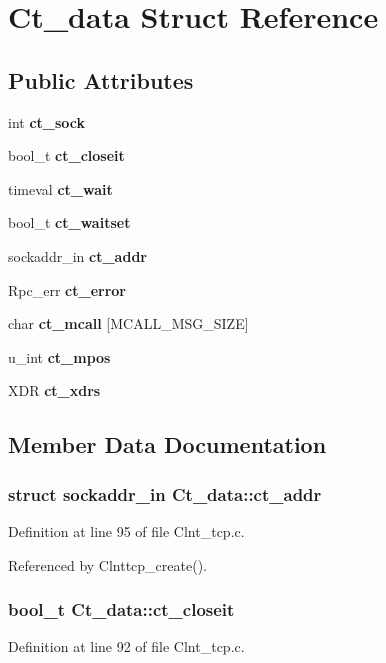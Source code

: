\section{Ct\_\-data Struct Reference}
\label{structCt__data}
\subsection*{Public Attributes}
\begin{CompactItemize}
\item 
int {\bf ct\_\-sock}
\item 
bool\_\-t {\bf ct\_\-closeit}
\item 
timeval {\bf ct\_\-wait}
\item 
bool\_\-t {\bf ct\_\-waitset}
\item 
sockaddr\_\-in {\bf ct\_\-addr}
\item 
Rpc\_\-err {\bf ct\_\-error}
\item 
char {\bf ct\_\-mcall} [MCALL\_\-MSG\_\-SIZE]
\item 
u\_\-int {\bf ct\_\-mpos}
\item 
XDR {\bf ct\_\-xdrs}
\end{CompactItemize}


\subsection{Member Data Documentation}
\subsubsection{\setlength{\rightskip}{0pt plus 5cm}struct sockaddr\_\-in {\bf Ct\_\-data::ct\_\-addr}}\label{structCt__data_o4}




Definition at line 95 of file Clnt\_\-tcp.c.

Referenced by Clnttcp\_\-create().
\subsubsection{\setlength{\rightskip}{0pt plus 5cm}bool\_\-t {\bf Ct\_\-data::ct\_\-closeit}}\label{structCt__data_o1}




Definition at line 92 of file Clnt\_\-tcp.c.

